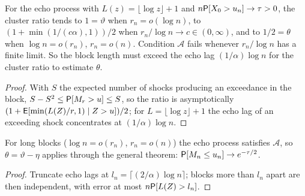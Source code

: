 \begin{theorem}
  \label{thm:echo-phase-transition}
  \leanok
  For the echo process with $L(z) = \lfloor \log z \rfloor + 1$ and $n \mathsf{P}[X_0 > u_n] \to \tau > 0$, the cluster ratio tends to
  $1 = \vartheta$ when $r_n = o(\log n)$, to $(1 + \min(1/(c\alpha), 1))/2$ when $r_n / \log n \to c \in (0, \infty)$, and to
  $1/2 = \theta$ when $\log n = o(r_n)$, $r_n = o(n)$. Condition $\mathcal A$ fails whenever $r_n/\log n$ has a finite
  limit. So the block length must exceed the echo lag $(1/\alpha)\log n$ for the cluster ratio to estimate $\theta$.
\end{theorem}
\begin{proof}
  \leanok
  With $S$ the expected number of shocks producing an exceedance in the block, $S - S^2 \le \mathsf{P}[M_r > u] \le S$, so the
  ratio is asymptotically $(1 + \mathsf{E}[\min(L(Z)/r, 1) \mid Z > u])/2$; for $L = \lfloor \log z \rfloor + 1$ the echo lag of an
  exceeding shock concentrates at $(1/\alpha)\log n$.
\end{proof}

\begin{theorem}
  \label{thm:echo-condition-a}
  \leanok
  For long blocks ($\log n = o(r_n)$, $r_n = o(n)$) the echo process satisfies $\mathcal A$, so $\theta = \vartheta - \eta$
  applies through the general theorem: $\mathsf{P}[M_n \le u_n] \to e^{-\tau/2}$.
\end{theorem}
\begin{proof}
  \leanok
  Truncate echo lags at $l_n = \lceil (2/\alpha)\log n \rceil$; blocks more than $l_n$ apart are then independent, with error
  at most $n\mathsf{P}[L(Z) > l_n]$.
\end{proof}

